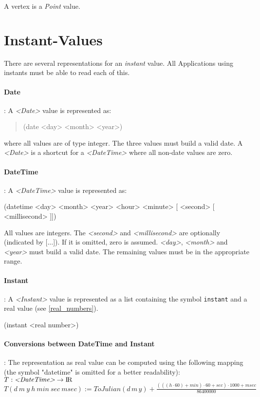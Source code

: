 \documentclass[english,a4paper]{article}
\newcommand{\R}{\ensuremath{\mbox{I\hspace*{-0.1em}R}}}
\begin{document}
A vertex is a \emph{Point} value.



\section{Instant-Values}
There are several representations for an \emph{instant} value.
All Applications using instants must be able to read each of this.

\paragraph{Date}:
A \emph{<Date>} value is represented as:
\begin{quotation}
  (date <day> <month> <year>)
\end{quotation}
where all values are of type integer. The three values must build a valid
date. A \emph{<Date>} is a shortcut for a \emph{<DateTime>} where all
non-date values are zero.

\paragraph{DateTime}:
A \emph{<DateTime>} value is represented as:
\begin{description}
  \item (datetime <day> <month> <year> <hour> <minute> [ <second> [ <millisecond> ]])
\end{description}

All values are integers. The \emph{<second>} and \emph{<millisecond>} are
optionally (indicated by [...]). If it is omitted, zero is assumed.
\emph{<day>}, \emph{<month>}  and \emph{<year>} must build a
valid date. The remaining values must be in the appropriate range.

\paragraph{Instant}:
A \emph{<Instant>} value is represented as a list containing the symbol {\tt instant}
and a real value (see \ref{real_numbers}).
\begin{description}
  \item (instant <real number>)
\end{description}


\paragraph{Conversions between DateTime and Instant}:
The representation as real value can be computed using the following
mapping (the symbol "datetime" is omitted for a better readability):\\
 $ T : \mbox{\emph{<DateTime>}} \rightarrow \R  $\\
 $ T(d\: m\: y\: h\: {min}\: {sec}\: {msec}) :=
      {ToJulian}(d\, m\, y) +
      \frac{ (((h\cdot 60) + min)\cdot 60 + sec)\cdot 1000+ msec}
           { 86400000 } $\\[1em]
\end{document}

